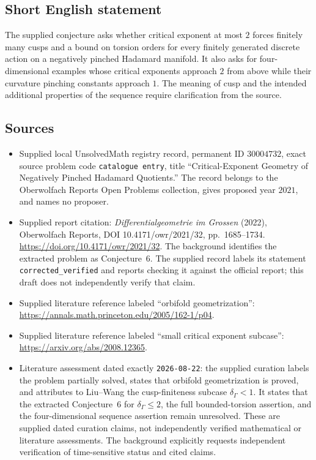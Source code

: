 \documentclass[11pt]{article}
\begin{document}
\subsection{Short English statement}
The supplied conjecture asks whether critical exponent at most $2$ forces finitely many cusps and a bound on torsion orders for every finitely generated discrete action on a negatively pinched Hadamard manifold. It also asks for four-dimensional examples whose critical exponents approach $2$ from above while their curvature pinching constants approach $1$. The meaning of cusp and the intended additional properties of the sequence require clarification from the source.
\subsection{Sources}
\begin{itemize}
\item Supplied local UnsolvedMath registry record, permanent ID $30004732$, exact source problem code \texttt{catalogue entry}, title ``Critical-Exponent Geometry of Negatively Pinched Hadamard Quotients.'' The record belongs to the Oberwolfach Reports Open Problems collection, gives proposed year $2021$, and names no proposer.
\item Supplied report citation: \emph{Differentialgeometrie im Grossen} (2022), Oberwolfach Reports, DOI 10.4171/owr/2021/32, pp.~1685--1734. \url{https://doi.org/10.4171/owr/2021/32}. The background identifies the extracted problem as Conjecture~6. The supplied record labels its statement \texttt{corrected\_verified} and reports checking it against the official report; this draft does not independently verify that claim.
\item Supplied literature reference labeled ``orbifold geometrization'': \url{https://annals.math.princeton.edu/2005/162-1/p04}.
\item Supplied literature reference labeled ``small critical exponent subcase'': \url{https://arxiv.org/abs/2008.12365}.
\item Literature assessment dated exactly \texttt{2026-08-22}: the supplied curation labels the problem partially solved, states that orbifold geometrization is proved, and attributes to Liu--Wang the cusp-finiteness subcase $\delta_\Gamma<1$. It states that the extracted Conjecture~6 for $\delta_\Gamma\leq2$, the full bounded-torsion assertion, and the four-dimensional sequence assertion remain unresolved. These are supplied dated curation claims, not independently verified mathematical or literature assessments. The background explicitly requests independent verification of time-sensitive status and cited claims.
\end{itemize}
\end{document}
